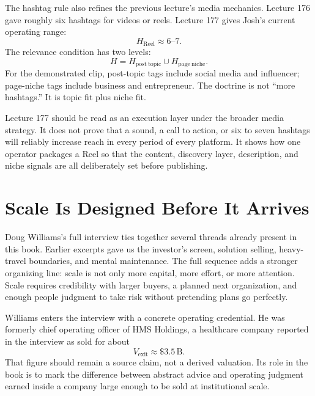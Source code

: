 \documentclass[11pt,oneside]{book}
\begin{document}
The hashtag rule also refines the previous lecture's media mechanics. Lecture 176 gave roughly six hashtags for videos or reels. Lecture 177 gives Josh's current operating range:
\[
H_{\mathrm{Reel}}\approx 6\text{--}7.
\]
The relevance condition has two levels:
\[
H
=
H_{\mathrm{post\ topic}}
\cup
H_{\mathrm{page\ niche}}.
\]
For the demonstrated clip, post-topic tags include social media and influencer; page-niche tags include business and entrepreneur. The doctrine is not ``more hashtags.'' It is topic fit plus niche fit.

\begin{remark}
Lecture 177 should be read as an execution layer under the broader media strategy. It does not prove that a sound, a call to action, or six to seven hashtags will reliably increase reach in every period of every platform. It shows how one operator packages a Reel so that the content, discovery layer, description, and niche signals are all deliberately set before publishing.
\end{remark}


\chapter{Scale Is Designed Before It Arrives}

Doug Williams's full interview ties together several threads already present in this book. Earlier excerpts gave us the investor's screen, solution selling, heavy-travel boundaries, and mental maintenance. The full sequence adds a stronger organizing line: scale is not only more capital, more effort, or more attention. Scale requires credibility with larger buyers, a planned next organization, and enough people judgment to take risk without pretending plans go perfectly.

Williams enters the interview with a concrete operating credential. He was formerly chief operating officer of HMS Holdings, a healthcare company reported in the interview as sold for about
\[
V_{\mathrm{exit}}\approx \$3.5\,\mathrm{B}.
\]
That figure should remain a source claim, not a derived valuation. Its role in the book is to mark the difference between abstract advice and operating judgment earned inside a company large enough to be sold at institutional scale.
\end{document}
